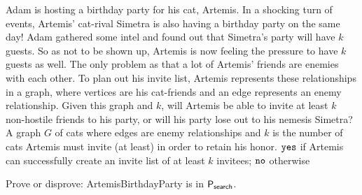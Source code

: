 \documentclass[11pt]{article}
\begin{document}
\begin{enumerate}
    Adam is hosting a birthday party for his cat, Artemis. In a shocking turn of events, Artemis' cat-rival Simetra is also having a birthday party on the same day! Adam gathered some intel and found out that Simetra’s party will have $k$ guests. So as not to be shown up, Artemis is now feeling the pressure to have $k$ guests as well. The only problem as that a lot of Artemis’ friends are enemies with each other. To plan out his invite list, Artemis represents these relationships in a graph, where vertices are his cat-friends and an edge represents an enemy relationship. Given this graph and $k$, will Artemis be able to invite at least $k$ non-hostile friends to his party, or will his party lose out to his nemesis Simetra?
    {A graph $G$ of cats where edges are enemy relationships and $k$ is the number of cats Artemis must invite (at least) in order to retain his honor.}
    {$\texttt{yes}$ if Artemis can successfully create an invite list of at least $k$ invitees; $\texttt{no}$ otherwise}

    Prove or disprove: ArtemisBirthdayParty is in $\mathsf{P_{search}}$.

\end{enumerate}
\end{document}
